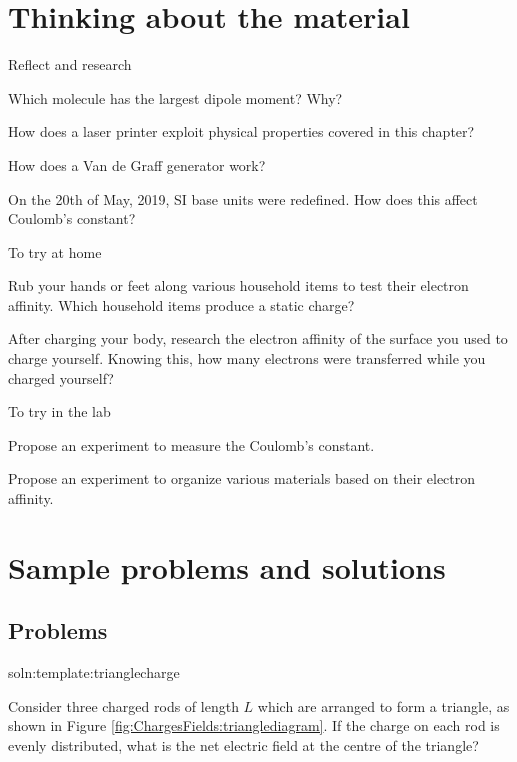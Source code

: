 \newpage
\section{Thinking about the material}

\begin{chapteractivity}{Reflect and research}
{
\item Which molecule has the largest dipole moment? Why?
\item How does a laser printer exploit physical properties covered in this chapter?
\item How does a Van de Graff generator work?
\item On the 20th of May, 2019, SI base units were redefined. How does this affect Coulomb's constant?
}
\end{chapteractivity}

\begin{chapteractivity}{To try at home}
{
\item Rub your hands or feet along various household items to test their electron affinity. Which household items produce a static charge?
\item After charging your body, research the electron affinity of the surface you used to charge yourself. Knowing this, how many electrons were transferred while you charged yourself?
}
\end{chapteractivity}

\begin{chapteractivity}{To try in the lab}
{
\item Propose an experiment to measure the Coulomb's constant.
\item Propose an experiment to organize various materials based on their electron affinity.
}
\end{chapteractivity}

\newpage
\section{Sample problems and solutions}





\subsection{Problems}
\begin{problem}{soln:template:trianglecharge}{\label{prob:template:trianglecharge} 
Consider three charged rods of length $L$ which are arranged to form a triangle, as shown in Figure \ref{fig:ChargesFields:trianglediagram}. If the charge on each rod is evenly distributed, what is the net electric field at the centre of the triangle?

}
\end{problem}

